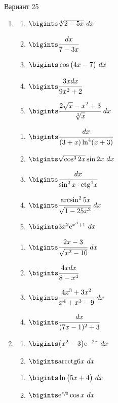 \documentclass{article}
\begin{document}
	

\begin{multicols}{2}

\centerline{Вариант 25}

\begin{enumerate}[label=\Roman*.]
	\item
	\begin{multicols}{3}
		\begin{enumerate}[label=\arabic*.]
			\setlength\itemsep{1em}
			\item $\bigints\sqrt[4]{2-5x}\ dx$
			\item $\bigints\cfrac{dx}{7-3x}$
			\item $\bigints\cos \big( 4x-7 \big)\ dx$
			\item $\bigints\cfrac{3xdx}{9x^2+2}$
			\item $\bigints\cfrac{2\sqrt{x} - x^2+3}{\sqrt[3]{x}}\ dx$
		\end{enumerate}
		\vfill\null\columnbreak
		\begin{enumerate}[label=\arabic*. , start=6]
			\setlength\itemsep{1em}
			\item $\bigints\cfrac{dx}{(3 + x)\ln^4(x+3)}$
			\item $\bigints\sqrt{\cos^32x}\sin 2x\ dx$
			\item $\bigints\cfrac{dx}{\sin^2x \cdot \mbox{ctg}^4x}$
			\item $\bigints\cfrac{\arcsin^2 5x}{\sqrt{1-25 x^2}}\ dx$
			\item $\bigints 3x^2\mbox{e}^{x^3 + 1}\ dx$
		\end{enumerate}
		\vfill\null\columnbreak
		\begin{enumerate}[label=\arabic*. , start=11]
			\setlength\itemsep{1em}
			\item $\bigints\cfrac{2x - 3}{\sqrt{x^2 - 10}}\ dx$
			\item $\bigints\cfrac{4xdx}{8-x^4}$
			\item $\bigints\cfrac{4x^3 + 3x^2}{x^4 + x^3 - 9}\ dx$
			\item $\bigints\cfrac{dx}{(7x - 1)^2 + 3}$
		\end{enumerate}
		\vfill\null\columnbreak
	\end{multicols}

	\item
	\begin{multicols}{3}
		\begin{enumerate}[label=\arabic*.]
			\setlength\itemsep{1em}
			\item $\bigints\big(x^2 - 3\big)\mbox{e}^{-2x}\ dx$
			\item $\bigints\mbox{arcctg}6x\ dx$
		\end{enumerate}
		\vfill\null\columnbreak
		\begin{enumerate}[label=\arabic*., start=3]
			\setlength\itemsep{1em}
			\item $\bigints\ln\big(5x + 4\big)\ dx$
			\item $\bigints\mbox{e}^{\sfrac{x}{5}}\cos x\ dx$
		\end{enumerate}
		\vfill\null\columnbreak
		\vfill\null\columnbreak
	\end{multicols}


\end{enumerate}
\end{multicols}
\end{document}
